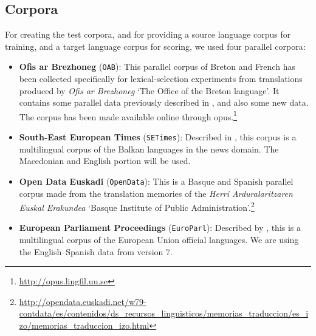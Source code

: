 \documentclass[11pt]{article}
\begin{document}
\subsection{Corpora}
\label{sec:eval-corpus}

For creating the test corpora, and for providing a source language corpus 
for training, and a target language corpus for scoring, we used four parallel corpora: 
\begin{itemize}
\addtolength{\itemsep}{-0.10in}
\item \textbf{Ofis ar Brezhoneg} (\texttt{OAB}): This parallel corpus
  of Breton and French has been collected specifically for
  lexical-selection experiments from translations produced by
  \emph{Ofis ar Brezhoneg} `The Office of the Breton
  language'.%
  It contains some parallel data
  previously described in \cite{tyers09b}, and also some new data. The
  corpus has been made available online through {\sc opus}.\footnote{\url{http://opus.lingfil.uu.se}}
\item \textbf{South-East European Times} (\texttt{SETimes}): Described
  in \cite{tyers10}, this corpus is a multilingual corpus of the
  Balkan languages in the news domain. The Macedonian and English
  portion will be used.
\item \textbf{Open Data Euskadi} (\texttt{OpenData}): This is a Basque
  and Spanish parallel corpus made from the translation memories of
  the \emph{Herri Arduralaritzaren Euskal Erakundea} `Basque Institute
  of Public
  Administration'.\footnote{\url{http://opendata.euskadi.net/w79-contdata/es/contenidos/ds_recursos_linguisticos/memorias_traduccion/es_izo/memorias_traduccion_izo.html}}
\item \textbf{European Parliament Proceedings} (\texttt{EuroParl}):
  Described by \cite{koehn05a}, this is a multilingual corpus of the
  European Union official languages. We are using the English--Spanish
  data from version 7.
\end{itemize}
\end{document}
